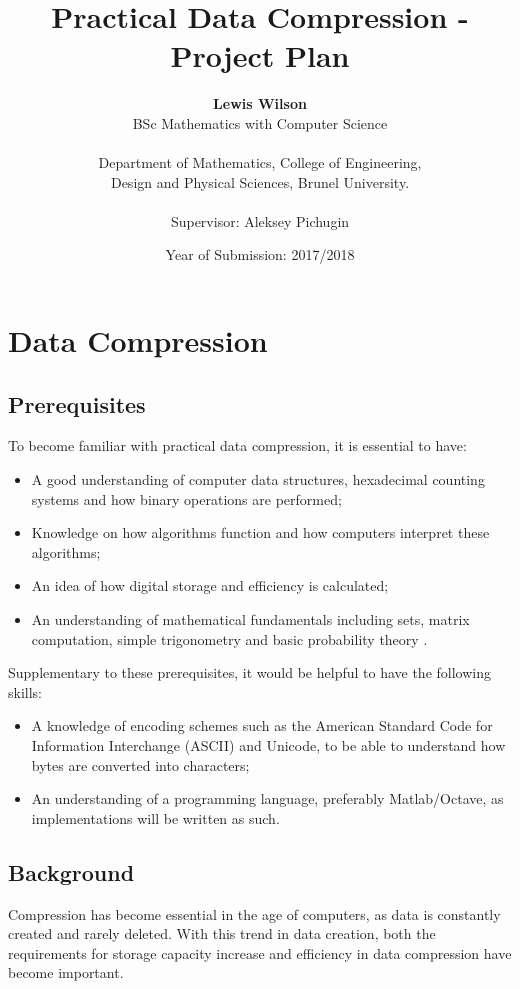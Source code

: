 \documentclass[12pt]{article}
\title{Practical Data Compression - Project Plan}
\author{\textbf{Lewis Wilson} \\
	BSc Mathematics with Computer Science\\\\
	Department of Mathematics, College of Engineering,\\ 
	Design and Physical Sciences, Brunel University.\\\\
	Supervisor: Aleksey Pichugin}
\date{Year of Submission: 2017/2018}
\begin{document}
	\begin{titlepage}
	\maketitle
	\thispagestyle{empty} %
	\end{titlepage}
	
	\setcounter{page}{1} %
	
	
	\section{Data Compression}
	\subsection{Prerequisites}
	To become familiar with practical data compression, it is essential to have:
	
	\begin{itemize}
		\item A good understanding of computer data structures, hexadecimal counting systems and how binary operations are performed;
		\item Knowledge on how algorithms function and how computers interpret these algorithms;
		\item An idea of how digital storage and efficiency is calculated;
		\item An understanding of mathematical fundamentals including sets, matrix computation, simple trigonometry and basic probability theory \citep{ipu_dc}.
	\end{itemize}

	\begin{flushleft}
		Supplementary to these prerequisites, it would be helpful to have the following skills:
	\end{flushleft}
	
	\begin{itemize}
		\item A knowledge of encoding schemes such as the American Standard Code for Information Interchange (ASCII) and Unicode, to be able to understand how bytes are converted into characters;
		\item An understanding of a programming language, preferably Matlab/Octave, as implementations will be written as such.
	\end{itemize}
	
	\subsection{Background}
	Compression has become essential in the age of computers, as data is constantly created and rarely deleted. With this trend in data creation, both the requirements for storage capacity increase and efficiency in data compression have become important.
	
\end{document}
